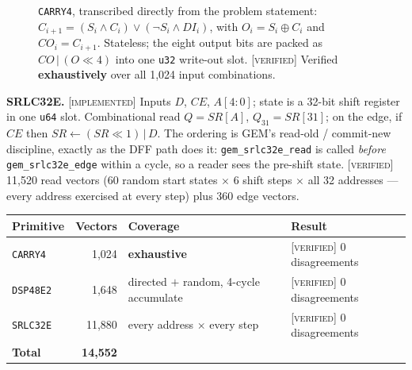 \documentclass[11pt]{article}
\newcommand{\V}{\textcolor{green!35!black}{\scriptsize\textsc{[verified]}}}
\newcommand{\I}{\textcolor{note}{\scriptsize\textsc{[implemented]}}}
\newcommand{\code}[1]{\texttt{\small #1}}
\begin{document}
\begin{figure}[h]\centering
{}
\caption{\code{CARRY4}, transcribed directly from the problem statement:
$C_{i+1} = (S_i \wedge C_i) \vee (\neg S_i \wedge DI_i)$, with
$O_i = S_i \oplus C_i$ and $CO_i = C_{i+1}$. Stateless; the eight output bits are
packed as $CO \,|\, (O \ll 4)$ into one \code{u32} write-out slot.
\V{} Verified \textbf{exhaustively} over all 1,024 input combinations.}
\label{fig:c4}
\end{figure}

\textbf{SRLC32E.} \I{} Inputs $D$, $CE$, $A[4{:}0]$; state is a 32-bit shift register in
one \code{u64} slot. Combinational read $Q = SR[A]$, $Q_{31} = SR[31]$; on the edge, if
$CE$ then $SR \leftarrow (SR \ll 1) \,|\, D$. The ordering is GEM's read-old /
commit-new discipline, exactly as the DFF path does it:
\code{gem\_srlc32e\_read} is called \emph{before} \code{gem\_srlc32e\_edge} within a
cycle, so a reader sees the pre-shift state. \V{} 11,520 read vectors (60 random start
states $\times$ 6 shift steps $\times$ all 32 addresses --- every address exercised at
every step) plus 360 edge vectors.

\begin{center}\small
\begin{tabular}{lrll}
\toprule
Primitive & Vectors & Coverage & Result\\
\midrule
\code{CARRY4}   & 1,024  & \textbf{exhaustive} & \V{} 0 disagreements\\
\code{DSP48E2}  & 1,648  & directed $+$ random, 4-cycle accumulate & \V{} 0 disagreements\\
\code{SRLC32E}  & 11,880 & every address $\times$ every step & \V{} 0 disagreements\\
\midrule
\textbf{Total}  & \textbf{14,552} & & \\
\bottomrule
\end{tabular}
\end{center}
\end{document}

